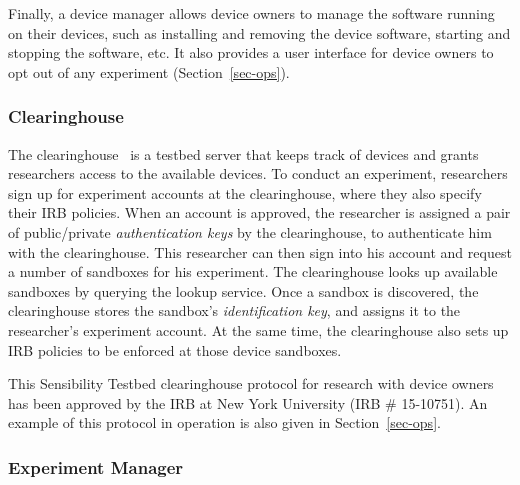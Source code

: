 Finally, a device manager allows device owners to manage the 
software running on their devices, such as installing and removing 
the device software, starting and stopping the software, etc. It also
provides a user interface for device owners to opt out of any 
experiment (Section~\ref{sec-ops}).

\subsubsection{Clearinghouse}\label{sec-ch}
The clearinghouse~\cite{ch} is a testbed server that keeps 
track of devices and grants researchers access to the 
available devices. 
To conduct an experiment, researchers sign up for experiment 
accounts at the clearinghouse, where they also specify their IRB 
policies. When an account is approved, the researcher is assigned 
a pair of public/private \textit{authentication keys} by the 
clearinghouse, to authenticate him with the clearinghouse. This
researcher can then sign into his account and request a 
number of sandboxes for his experiment. The clearinghouse 
looks up available sandboxes by querying the lookup service. 
Once a sandbox is discovered, the clearinghouse stores the 
sandbox's \textit{identification key}, and assigns it to the researcher's 
experiment account. At the same time, the clearinghouse also
sets up IRB policies to be enforced at those device sandboxes. 

This Sensibility Testbed clearinghouse 
protocol for research with device owners has been approved by
the IRB at New York University (IRB \# 15-10751). An example 
of this protocol in operation is also given in Section~\ref{sec-ops}.
%




\subsubsection{Experiment Manager}\label{sec-emt}

